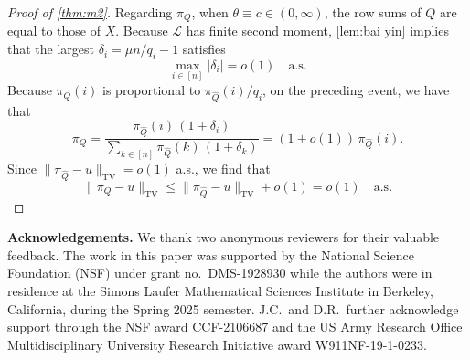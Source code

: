 \documentclass[12pt]{amsart}
\newcommand\wh[1]{\widehat{#1}}
\DeclareMathOperator{\1}{\mathbf{1}}
\begin{document}
\begin{proof}[Proof of \cref{thm:m2}]
Regarding $\pi_Q$, when $\theta \equiv c \in (0,\infty)$, the row sums of $Q$ are equal to those of $X$. Because $\mathcal{L}$ has finite second moment, \cref{lem:bai yin} implies that the largest $\delta_i = \mu n / q_i - 1$ satisfies
\[
	\max_{i \in [n]} |\delta_i| = o(1) \quad \mathrm{a.s.} 
\]
Because $\pi_Q (i)$ is proportional to $\pi_{\wh{Q}} (i)/q_i$, on the preceding event, we have that
\[
	\pi_Q = \frac{\pi_{\wh{Q}}(i)\, (1+\delta_i)}{\sum_{k \in [n]} \pi_{\wh{Q}}(k)\, (1+\delta_k)} = (1+o(1))\, \pi_{\wh{Q}} (i).
\]
Since $\|\pi_{\wh{Q}} - u\|_{\mathrm{TV}} = o(1)$ a.s., we find that
\[
	\| \pi_Q - u \|_{\mathrm{TV}} \leq \| \pi_{\wh{Q}} - u \|_{\mathrm{TV}} + o(1) = o(1) \quad \mathrm{a.s.}
\]
\end{proof}




\noindent 
\textbf{Acknowledgements.} We thank two anonymous reviewers for their valuable feedback. The work in this paper was supported by the National Science Foundation (NSF) under grant no.\ DMS-1928930 while the authors were in residence at the Simons Laufer Mathematical Sciences Institute in Berkeley, California, during the Spring 2025 semester. J.C.\ and D.R.\ further acknowledge support through the NSF award CCF-2106687 and the US Army Research Office Multidisciplinary University Research Initiative award W911NF-19-1-0233.


%
%
\end{document}
